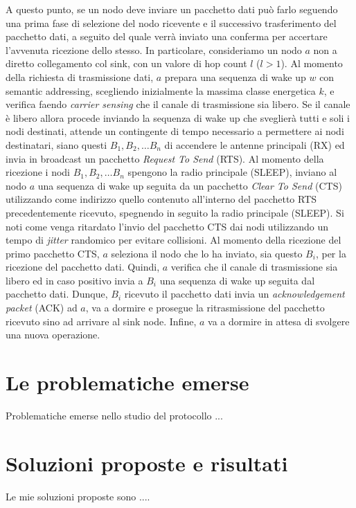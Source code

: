 \documentclass{report}
\begin{document}
A questo punto, se un nodo deve inviare un pacchetto dati può farlo seguendo una prima fase di selezione del nodo ricevente e il
successivo trasferimento del pacchetto dati, a seguito del quale verrà inviato una conferma per accertare l'avvenuta ricezione dello stesso. In particolare,
consideriamo un nodo $a$ non a diretto collegamento col sink, con un valore di hop count $l$ ($l>1$). Al momento della richiesta di trasmissione dati,
$a$ prepara una sequenza di wake up $w$ con semantic addressing, scegliendo inizialmente la massima classe energetica $k$, e verifica faendo
\emph{carrier sensing} che il canale di trasmissione sia libero. Se il canale è libero allora procede inviando la sequenza di wake up che sveglierà tutti
e soli i nodi destinati, attende un contingente di tempo necessario a permettere ai nodi destinatari, siano questi $B_1, B_2, \ldots B_n$
 di accendere le antenne principali (RX) ed invia in broadcast un pacchetto \emph{Request To Send} (RTS). Al momento della ricezione
 i nodi $B_1, B_2, \ldots B_n$ spengono la radio principale (SLEEP), inviano al nodo $a$ una sequenza di wake up seguita da un pacchetto
\emph{Clear To Send} (CTS) utilizzando come indirizzo quello contenuto all'interno del pacchetto RTS precedentemente ricevuto, spegnendo in seguito
la radio principale (SLEEP). Si noti come venga ritardato l'invio del pacchetto CTS dai nodi utilizzando un tempo di \emph{jitter} randomico
per evitare collisioni. Al momento della ricezione del primo pacchetto CTS, $a$ seleziona il nodo che lo ha inviato, sia questo $B_i$,
per la ricezione del pacchetto dati. Quindi, $a$ verifica che il canale di trasmissione sia libero ed in caso positivo invia a $B_i$ una sequenza di wake up
seguita dal pacchetto dati. Dunque, $B_i$ ricevuto il pacchetto dati invia un \emph{acknowledgement packet} (ACK) ad $a$, va a dormire e prosegue la
ritrasmissione del pacchetto ricevuto sino ad arrivare al sink node. Infine, $a$ va a dormire in attesa di svolgere una nuova operazione.

\section{Le problematiche emerse}

Problematiche emerse nello studio del protocollo ...

\section{Soluzioni proposte e risultati}

Le mie soluzioni proposte sono ....

\end{document}
